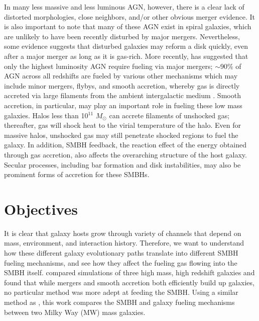 \documentclass[12pt,headA,chapB]{fiskthesis}
\begin{document}
In many less massive and less luminous AGN, however, there is a clear lack of distorted morphologies, close neighbors, and/or other obvious merger evidence.  \citep{Ryan2007,Schawinski2011,Ellison2013,Hicks2013} It is also important to note that many of these AGN exist in spiral galaxies, which are unlikely to have been recently disturbed by major mergers. \citep{Springel2005,Kocevski2011} Nevertheless, some evidence suggests \citep{vanGorkom1997,Governato2009} that disturbed galaxies may reform a disk quickly, even after a major merger as long as it is gas-rich. More recently, \cite{Treister2012} has suggested that only the highest luminosity AGN require fueling via major mergers; $\sim$90\% of AGN across all redshifts are fueled by various other mechanisms which may include minor mergers, flybys, and smooth accretion, whereby gas is directly accreted via large filaments from the ambient intergalactic medium \citep{Cox2006,Bellovary2013,Sinha2012}. 
Smooth accretion, in particular, may play an important role in fueling these low mass galaxies. Halos less than 10$^{11}$ $M_{\odot}$ can accrete filaments of unshocked gas; thereafter, gas will shock heat to the virial temperature of the halo. \citep{Keres2005} Even for massive halos, unshocked gas may still penetrate shocked regions to fuel the galaxy. \citep{Brooks2007,Dekel2009,Nelson2013} In addition, SMBH feedback, the reaction effect of the energy obtained through gas accretion, also affects the overarching structure of the host galaxy. Secular processes, including bar formation and disk instabilities, may also be prominent forms of accretion for these SMBHs. \citep{Kormendy2013}  

\section{Objectives}
It is clear that galaxy hosts grow through variety of channels that depend on mass, environment, and interaction history. Therefore, we want to understand how these different galaxy evolutionary paths translate into different SMBH fueling mechanisms, and see how they affect the fueling gas flowing into the SMBH itself. \cite{Bellovary2013} compared simulations of three high mass, high redshift galaxies and found that while mergers and smooth accretion both efficiently build up galaxies, no particular method was more adept at feeding the SMBH. Using a similar method as \cite{Bellovary2013}, this work compares the SMBH and galaxy fueling mechanisms between two Milky Way (MW) mass galaxies. 
\end{document}

